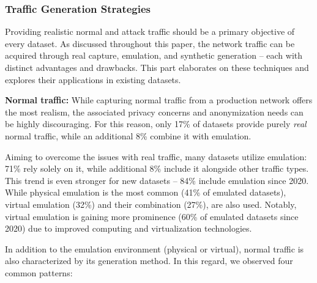 \subsubsection{Traffic Generation Strategies}
\label{sssec:ndatasurv_trends_traffic_generation}

Providing realistic normal and attack traffic should be a primary objective of every dataset. As discussed throughout this paper, the network traffic can be acquired through real capture, emulation, and synthetic generation -- each with distinct advantages and drawbacks. This part elaborates on these techniques and explores their applications in existing datasets.

\textbf{Normal traffic:} While capturing normal traffic from a production network offers the most realism, the associated privacy concerns and anonymization needs can be highly discouraging. For this reason, only 17\% of datasets provide purely \emph{real} normal traffic, while an additional 8\% combine it with emulation.

Aiming to overcome the issues with real traffic, many datasets utilize emulation: 71\% rely solely on it, while additional 8\% include it alongside other traffic types. This trend is even stronger for new datasets -- 84\% include emulation since 2020. While physical emulation is the most common (41\% of emulated datasets), virtual emulation (32\%) and their combination (27\%), are also used. Notably, virtual emulation is gaining more prominence (60\% of emulated datasets since 2020) due to improved computing and virtualization technologies.

In addition to the emulation environment (physical or virtual), normal traffic is also characterized by its generation method. In this regard, we observed four common patterns:

